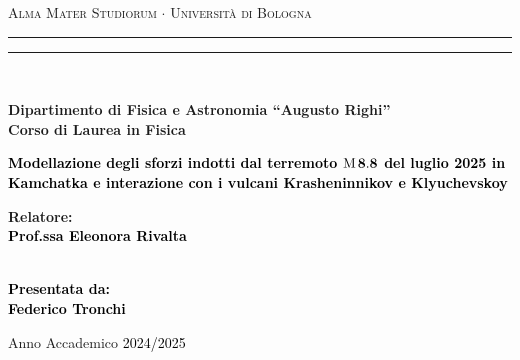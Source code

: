 \begin{titlepage}
%
%
%
%
\begin{center}
{{\Large{\textsc{Alma Mater Studiorum $\cdot$ Universit\`a di Bologna}}}} 
\rule[0.1cm]{15.8cm}{0.1mm}
\rule[0.5cm]{15.8cm}{0.6mm}
\\\vspace{3mm}

{\small{\bf Dipartimento di Fisica e Astronomia “Augusto Righi”\\
Corso di Laurea in Fisica}}

\end{center}

\vspace{23mm}

\begin{center}\textcolor{black}{
%
%
{\LARGE{\bf 
Modellazione degli sforzi indotti dal
terremoto \(\text{M}\hspace{0.5mm}\mathbf{8.8}\) del luglio 2025 in
Kamchatka e interazione con i vulcani
Krasheninnikov e Klyuchevskoy
}}}\end{center}

\vspace{45mm} \par \noindent

\begin{minipage}[t]{0.47\textwidth}
%
%
{\large{\bf Relatore: \vspace{2mm}\\\textcolor{black}{
Prof.ssa Eleonora Rivalta}\\\\
%
%
%

}}
\end{minipage}
%
\hfill
%
\begin{minipage}[t]{0.47\textwidth}\raggedleft \textcolor{black}{
{\large{\bf Presentata da:
\vspace{2mm}\\
%
%
Federico Tronchi}}}
\end{minipage}

\vspace{35mm}

\begin{center}
%
%
Anno Accademico \textcolor{black}{ 2024/2025}
\end{center}

\end{titlepage}